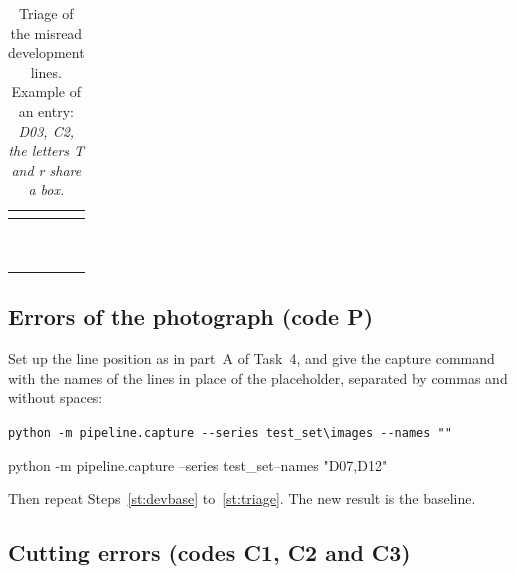 \begin{table}[H]
\centering
\begin{tabular}{C{1.3cm}C{1.3cm}L{8.2cm}}
\toprule
{} &  &  \\
\midrule
 & & \\[5pt] 
 & & \\[5pt] 
 & & \\[5pt] 
 & & \\[5pt] 
 & & \\[5pt] 
 & & \\[5pt] 
 & & \\[5pt] 
 & & \\[5pt] 
 & & \\[5pt] 
 & & \\[5pt]
\bottomrule
\end{tabular}
\caption{Triage of the misread development lines. Example of an entry: \emph{D03, C2, the
letters T and r share a box.}}
\label{tab:triage}
\end{table}

\subsection{Errors of the photograph (code P)}

Set up the line position as in part~A of Task~4, and give the capture command with the names of
the lines in place of the placeholder, separated by commas and without spaces:
\begin{center}
\mbox{\footnotesize\texttt{python -m pipeline.capture -{}-series test\_set\textbackslash{}images -{}-names "}\texttt{"}}
\end{center}
\begin{out}
python -m pipeline.capture --series test_set\images --names "D07,D12"
\end{out}
Then repeat Steps~\ref{st:devbase} to~\ref{st:triage}. The new result is the baseline.

\subsection{Cutting errors (codes C1, C2 and C3)}
\label{sec:cutting}

